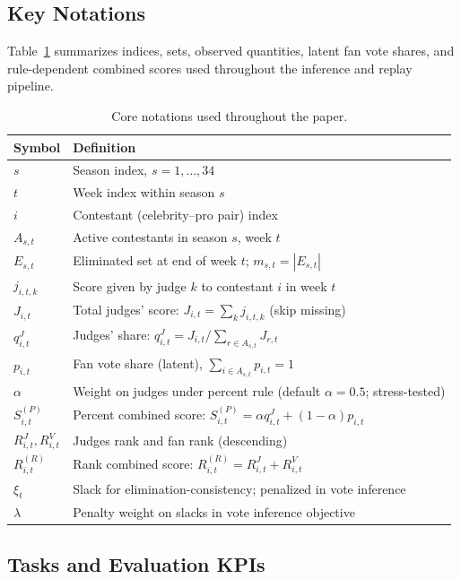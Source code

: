 \subsection{Key Notations}\label{subsec:notations}
Table~\ref{tab:notations} summarizes indices, sets, observed quantities, latent fan vote shares, and rule-dependent combined scores used throughout the inference and replay pipeline.
\begin{table}[H]
\centering
\small
\begin{tabular}{ll}
\toprule
Symbol & Definition \\
\midrule
$s$ & Season index, $s=1,\dots,34$ \\
$t$ & Week index within season $s$ \\
$i$ & Contestant (celebrity--pro pair) index \\
$A_{s,t}$ & Active contestants in season $s$, week $t$ \\
$E_{s,t}$ & Eliminated set at end of week $t$; $m_{s,t}=|E_{s,t}|$ \\
$j_{i,t,k}$ & Score given by judge $k$ to contestant $i$ in week $t$ \\
$J_{i,t}$ & Total judges' score: $J_{i,t}=\sum_{k} j_{i,t,k}$ (skip missing) \\
$q^{J}_{i,t}$ & Judges' share: $q^{J}_{i,t}=J_{i,t}\big/\sum_{r\in A_{s,t}}J_{r,t}$ \\
$p_{i,t}$ & Fan vote share (latent), $\sum_{i\in A_{s,t}}p_{i,t}=1$ \\
$\alpha$ & Weight on judges under percent rule (default $\alpha=0.5$; stress-tested) \\
$S^{(P)}_{i,t}$ & Percent combined score: $S^{(P)}_{i,t}=\alpha q^{J}_{i,t}+(1-\alpha)p_{i,t}$ \\
$R^{J}_{i,t},R^{V}_{i,t}$ & Judges rank and fan rank (descending) \\
$R^{(R)}_{i,t}$ & Rank combined score: $R^{(R)}_{i,t}=R^{J}_{i,t}+R^{V}_{i,t}$ \\
$\xi_t$ & Slack for elimination-consistency; penalized in vote inference \\
$\lambda$ & Penalty weight on slacks in vote inference objective \\
\bottomrule
\end{tabular}
\caption{Core notations used throughout the paper.}
\label{tab:notations}
\end{table}

\subsection{Tasks and Evaluation KPIs}\label{subsec:tasks_and_kpis}

